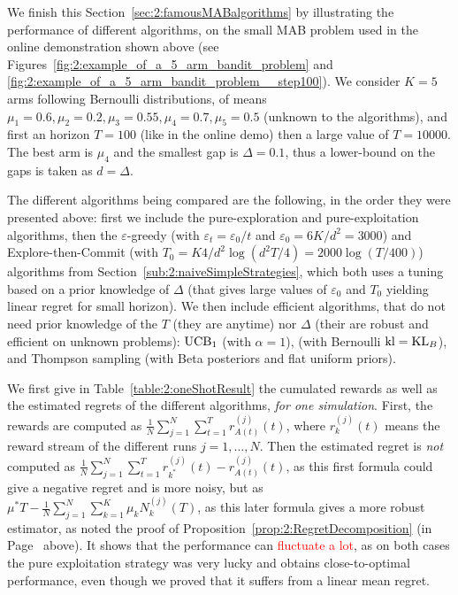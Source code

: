 
We finish this Section~\ref{sec:2:famousMABalgorithms} by illustrating the performance of different algorithms, on the small MAB problem used in the online demonstration shown above (see Figures~\ref{fig:2:example_of_a_5_arm_bandit_problem} and \ref{fig:2:example_of_a_5_arm_bandit_problem__step100}).
We consider $K=5$ arms following Bernoulli distributions, of means $\mu_1=0.6,\mu_2=0.2,\mu_3=0.55,\mu_4=0.7,\mu_5=0.5$ (unknown to the algorithms), and first an horizon $T=100$ (like in the online demo) then a large value of $T=10000$.
The best arm is $\mu_4$ and the smallest gap is $\Delta = 0.1$, thus a lower-bound on the gaps is taken as $d=\Delta$.

The different algorithms being compared are the following, in the order they were presented above:
%
first we include the pure-exploration and
pure-exploitation algorithms,
then the $\varepsilon$-greedy (with $\varepsilon_t=\varepsilon_0/t$ and $\varepsilon_0=6K/d^2=3000$) and
Explore-then-Commit (with $T_0=K4/d^2 \log(d^2T/4)=2000\log(T/400)$) algorithms
from Section~\ref{sub:2:naiveSimpleStrategies}, which both uses a tuning based on a prior knowledge of $\Delta$ (that gives large values of $\varepsilon_0$ and $T_0$ yielding linear regret for small horizon).
%
We then include efficient algorithms, that do not need prior knowledge of the $T$ (they are anytime) nor $\Delta$ (their are robust and efficient on unknown problems):
$\mathrm{UCB}_1$ (with $\alpha=1$),
\klUCB{} (with Bernoulli $\mathrm{kl} = \mathrm{KL}_{B}$),
and Thompson sampling (with Beta posteriors and flat uniform priors).
%

We first give in Table~\ref{table:2:oneShotResult} the cumulated rewards as well as the estimated regrets of the different algorithms, \emph{for one simulation}.
First, the rewards are computed as $\frac{1}{N} \sum_{j=1}^N \sum_{t=1}^T r^{(j)}_{A(t)}(t)$, where $r^{(j)}_{k}(t)$ means the reward stream of the different runs $j=1,\dots,N$. Then the estimated regret is \emph{not} computed as $\frac{1}{N} \sum_{j=1}^N \sum_{t=1}^T r^{(j)}_{k^*}(t) - r^{(j)}_{A(t)}(t)$, as this first formula could give a negative regret and is more noisy, but as $\mu^* T - \frac{1}{N} \sum_{j=1}^N \sum_{k=1}^K \mu_k N^{(j)}_{k}(T)$, as this later formula gives a more robust estimator, as noted the proof of Proposition~\ref{prop:2:RegretDecomposition} (in Page~\pageref{remark:2:moreAccurateCountofRegretForSimulations} above).
%
It shows that the performance can \textcolor{red}{fluctuate a lot}, as on both cases the pure exploitation strategy was very lucky and obtains close-to-optimal performance, even though we proved that it suffers from a linear mean regret.

